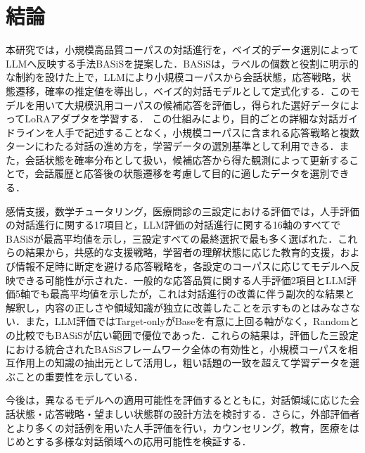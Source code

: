 \documentclass[manuscript,review,anonymous]{acmart}
\begin{document}
\section{結論}
\label{sec:conclusion}

本研究では，小規模高品質コーパスの対話進行を，ベイズ的データ選別によってLLMへ反映する手法BASiSを提案した．BASiSは，ラベルの個数と役割に明示的な制約を設けた上で，LLMにより小規模コーパスから会話状態，応答戦略，状態遷移，確率の推定値を導出し，ベイズ的対話モデルとして定式化する．このモデルを用いて大規模汎用コーパスの候補応答を評価し，得られた選好データによってLoRAアダプタを学習する．
この仕組みにより，目的ごとの詳細な対話ガイドラインを人手で記述することなく，小規模コーパスに含まれる応答戦略と複数ターンにわたる対話の進め方を，学習データの選別基準として利用できる．また，会話状態を確率分布として扱い，候補応答から得た観測によって更新することで，会話履歴と応答後の状態遷移を考慮して目的に適したデータを選別できる．

感情支援，数学チュータリング，医療問診の三設定における評価では，人手評価の対話進行に関する17項目と，LLM評価の対話進行に関する16軸のすべてでBASiSが最高平均値を示し，三設定すべての最終選択で最も多く選ばれた．これらの結果から，共感的な支援戦略，学習者の理解状態に応じた教育的支援，および情報不足時に断定を避ける応答戦略を，各設定のコーパスに応じてモデルへ反映できる可能性が示された．一般的な応答品質に関する人手評価2項目とLLM評価5軸でも最高平均値を示したが，これは対話進行の改善に伴う副次的な結果と解釈し，内容の正しさや領域知識が独立に改善したことを示すものとはみなさない．また，LLM評価ではTarget-onlyがBaseを有意に上回る軸がなく，Randomとの比較でもBASiSが広い範囲で優位であった．これらの結果は，評価した三設定における統合されたBASiSフレームワーク全体の有効性と，小規模コーパスを相互作用上の知識の抽出元として活用し，粗い話題の一致を超えて学習データを選ぶことの重要性を示している．

今後は，異なるモデルへの適用可能性を評価するとともに，対話領域に応じた会話状態・応答戦略・望ましい状態群の設計方法を検討する．さらに，外部評価者とより多くの対話例を用いた人手評価を行い，カウンセリング，教育，医療をはじめとする多様な対話領域への応用可能性を検証する．
\end{document}
